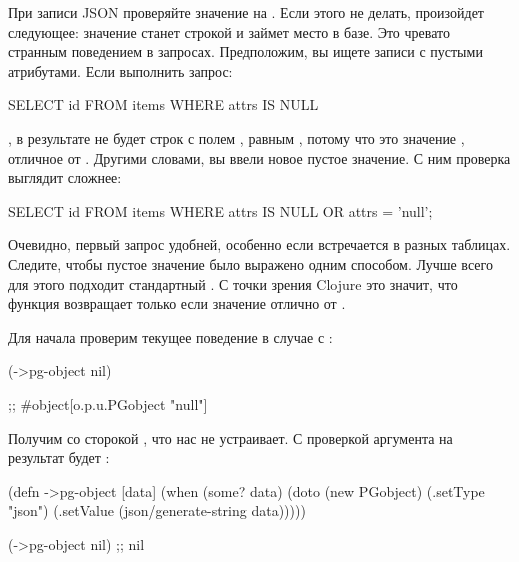 При записи JSON проверяйте значение на . Если этого не делать, произойдет следующее: значение  станет строкой  и займет место в базе. Это чревато странным поведением в запросах. Предположим, вы ищете записи с пустыми атрибутами. Если выполнить запрос:

\begin{english}
  \begin{sql}
SELECT id FROM items WHERE attrs IS NULL
  \end{sql}
\end{english}

\noindent
, в результате не будет строк с полем , равным , потому что это значение , отличное от . Другими словами, вы ввели новое пустое значение. С ним проверка выглядит сложнее:

\begin{english}
  \begin{sql}
SELECT id FROM items
WHERE attrs IS NULL OR attrs = 'null';
  \end{sql}
\end{english}

Очевидно, первый запрос удобней, особенно если  встречается в разных таблицах. Следите, чтобы пустое значение было выражено одним способом. Лучше всего для этого подходит стандартный . С точки зрения Clojure это значит, что функция  возвращает  только если значение отлично от .

Для начала проверим текущее поведение в случае с :

\begin{english}
  \begin{clojure}
(->pg-object nil)

;; #object[o.p.u.PGobject "null"]
  \end{clojure}
\end{english}

Получим  со сторокой , что нас не устраивает. С проверкой аргумента на  результат будет :

\begin{english}
  \begin{clojure}
(defn ->pg-object [data]
  (when (some? data)
    (doto (new PGobject)
      (.setType "json")
      (.setValue (json/generate-string data)))))

(->pg-object nil) ;; nil
  \end{clojure}
\end{english}

